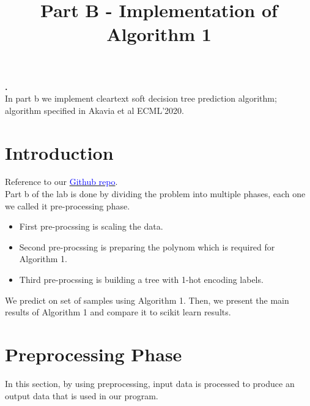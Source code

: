 \documentclass{article}
\renewenvironment{abstract}
 {\par\noindent\textbf{\abstractname.}\ \ignorespaces}
 {\par\medskip}
\begin{document}
\title{
Part B - Implementation of Algorithm 1}



\maketitle
\tableofcontents

\newpage

\begin{abstract}
\\In  part b we implement cleartext soft decision tree prediction algorithm; algorithm specified in Akavia et al ECML’2020. 
\end{abstract}


\section{Introduction}
Reference to our \href{https://github.com/assiakhateeb/PPML_lab/tree/main/part\%20B}{\textcolor{blue}{Github repo}}.\\
Part b of the lab is done by dividing the problem into multiple phases, each one we called it pre-processing phase.
\begin{itemize}
\item First pre-procssing is scaling the data.
\item Second pre-procssing is preparing the polynom which is required for Algorithm 1.
\item Third pre-procssing is building a tree with 1-hot encoding labels.
\end{itemize}
We predict on set of samples using Algorithm 1.
Then, we present the main results of Algorithm 1 and compare it to scikit learn results.\\


\section{Preprocessing Phase}
In this section, by using preprocessing, input data is processed to produce an output data that is used in our program.
\end{document}
